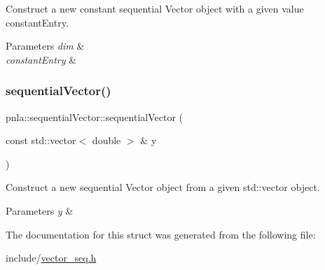 Construct a new constant sequential Vector object with a given value constant\+Entry. 


\begin{DoxyParams}{Parameters}
{\em dim} & \\
\hline
{\em constant\+Entry} & \\
\hline
\end{DoxyParams}
\mbox{\label{structpnla_1_1sequentialVector_a812d6961a41836a9d594dc3045da854d}} 
\subsubsection{\texorpdfstring{sequential\+Vector()}{sequentialVector()}\hspace{0.1cm}{\footnotesize\ttfamily [3/3]}}
{\footnotesize\ttfamily pnla\+::sequential\+Vector\+::sequential\+Vector (\begin{DoxyParamCaption}\item[{const std\+::vector$<$ double $>$ \&}]{y }\end{DoxyParamCaption})\hspace{0.3cm}{\ttfamily [inline]}}



Construct a new sequential Vector object from a given std\+::vector object. 


\begin{DoxyParams}{Parameters}
{\em y} & \\
\hline
\end{DoxyParams}


The documentation for this struct was generated from the following file\+:\begin{DoxyCompactItemize}
\item 
include/\mbox{\hyperlink{vector__seq_8h}{vector\+\_\+seq.\+h}}\end{DoxyCompactItemize}
